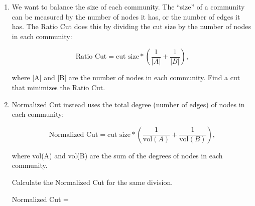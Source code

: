 \documentclass[a4paper, 14pt]{extarticle}
\begin{document}
\begin{enumerate}[resume]
    \item We want to balance the size of each community. The ``size'' of a community can be measured by the number of nodes it has, or the number of edges it has. The Ratio Cut does this by dividing the cut size by the number of nodes in each community:

    $$
    \text{Ratio Cut} = \text{cut size} * \left(\frac{1}{|A|} + \frac{1}{|B|}\right),
    $$

    where |A| and |B| are the number of nodes in each community. Find a cut that minimizes the Ratio Cut.

    \vspace{3cm}
    \item Normalized Cut instead uses the total degree (number of edges) of nodes in each community:

    $$
    \text{Normalized Cut} = \text{cut size} * \left(\frac{1}{\text{vol}(A)} + \frac{1}{\text{vol}(B)}\right),
    $$

    where vol(A) and vol(B) are the sum of the degrees of nodes in each community.

    Calculate the Normalized Cut for the same division.

    Normalized Cut = \underline{\hspace{4cm}}

    \vspace{3cm}
\end{enumerate}
\end{document}
